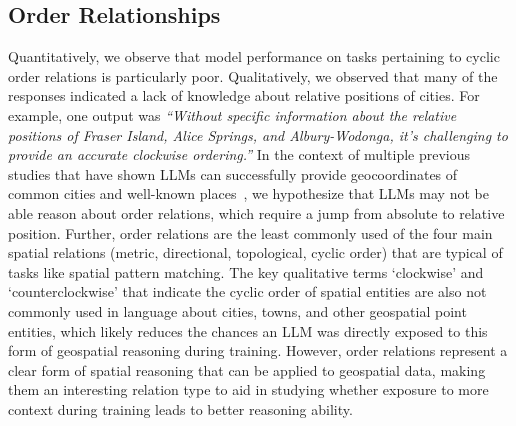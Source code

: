 \subsection{Order Relationships}
Quantitatively, we observe that model performance on tasks pertaining to cyclic order relations is particularly poor.
Qualitatively, we observed that many of the responses indicated a lack of knowledge about relative positions of cities.
For example, one output was 
\textit{``Without specific information about the relative positions of Fraser Island, Alice Springs, and Albury-Wodonga, it's challenging to provide an accurate clockwise ordering.''}
In the context of multiple previous studies that have shown LLMs can successfully provide geocoordinates of common cities and well-known places~\cite{Bhandari2023,Qi2023}, we hypothesize that LLMs may not be able reason about order relations, which require a jump from absolute to relative position. 
Further, order relations are the least commonly used of the four main spatial relations (metric, directional, topological, cyclic order) that are typical of tasks like spatial pattern matching.
The key qualitative terms `clockwise' and `counterclockwise' that indicate the cyclic order of spatial entities are also not commonly used in language about cities, towns, and other geospatial point entities, which likely reduces the chances an LLM was directly exposed to this form of geospatial reasoning during training.
However, order relations represent a clear form of spatial reasoning that can be applied to geospatial data, making them an interesting relation type to aid in studying whether exposure to more context during training leads to better reasoning ability.


